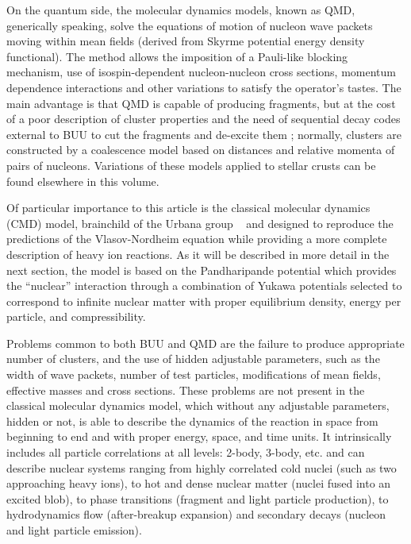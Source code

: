 On the quantum side, the molecular dynamics models, known as QMD,
generically speaking, solve the equations of motion of nucleon
wave packets moving within mean fields (derived from Skyrme potential
energy density functional).  The method allows the imposition of a
Pauli-like blocking mechanism, use of isospin-dependent
nucleon-nucleon cross sections, momentum dependence interactions and
other variations to satisfy the operator's tastes.  The main advantage
is that QMD is capable of producing fragments, but at the cost of a
poor description of cluster properties and the need of sequential
decay codes external to BUU to cut the fragments and de-excite them
\cite{polanski_development_2005}; normally, clusters are constructed
by a coalescence model based on distances and relative momenta of
pairs of nucleons. Variations of these models applied to stellar
crusts can be found elsewhere in this volume.

Of particular importance to this article is the classical molecular
dynamics (CMD) model, brainchild of the Urbana group
~\cite{lenk_accuracy_1990} and designed to reproduce the predictions
of the Vlasov-Nordheim equation while providing a more complete
description of heavy ion reactions.  As it will be described in more
detail in the next section, the model is based on the Pandharipande
potential which provides the ``nuclear'' interaction through a
combination of Yukawa potentials selected to correspond to infinite
nuclear matter with proper equilibrium density, energy per particle,
and compressibility.

Problems common to both BUU and QMD are the failure to produce
appropriate number of clusters, and the use of hidden adjustable
parameters, such as the width of wave packets, number of test
particles, modifications of mean fields, effective masses and cross
sections.  These problems are not present in the classical molecular
dynamics model, which without any adjustable parameters, hidden or
not, is able to describe the dynamics of the reaction in space from
beginning to end and with proper energy, space, and time units.  It
intrinsically includes all particle correlations at all levels:
2-body, 3-body, etc. and can describe nuclear systems ranging from
highly correlated cold nuclei (such as two approaching heavy ions), to
hot and dense nuclear matter (nuclei fused into an excited blob), to
phase transitions (fragment and light particle production), to
hydrodynamics flow (after-breakup expansion) and secondary decays
(nucleon and light particle emission).

